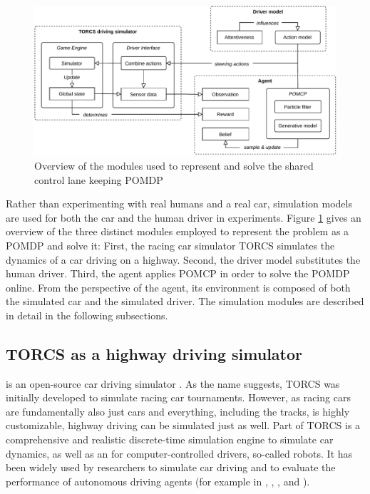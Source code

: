 
\begin{figure}[htbp]
    \centerfloat
    \includegraphics[width=1.0\textwidth]{figures/Components.pdf}
    \caption{Overview of the modules used to represent and solve the shared control lane keeping POMDP}
    \label{fig:overview}
\end{figure}

Rather than experimenting with real humans and a real car, simulation models are used for both the car and the human driver in experiments. Figure \ref{fig:overview} gives an overview of the three distinct modules employed to represent the problem as a POMDP and solve it: First, the racing car simulator TORCS \parencite{torcs} simulates the dynamics of a car driving on a highway. Second, the driver model substitutes the human driver. Third, the agent applies POMCP in order to solve the POMDP online. From the perspective of the agent, its environment is composed of both the simulated car and the simulated driver. The simulation modules are described in detail in the following subsections. 

\subsection{TORCS as a highway driving simulator}
\label{torcs}

 is an open-source car driving simulator \parencite{torcs}. As the name suggests, TORCS was initially developed to simulate racing car tournaments. However, as racing cars are fundamentally also just cars and everything, including the tracks, is highly customizable, highway driving can be simulated just as well. Part of TORCS is a comprehensive and realistic discrete-time simulation engine to simulate car dynamics, as well as an  for computer-controlled drivers, so-called robots. It has been widely used by researchers to simulate car driving and to evaluate the performance of autonomous driving agents (for example in \cite{torcs-3}, \cite{torcs-1}, \cite{torcs-2}, and \cite{reward1}).

